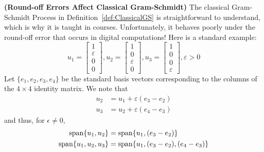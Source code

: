 \begin{rem}
\label{rem:ModifiedGramSchmidt} \textbf{(Round-off Errors Affect Classical Gram-Schmidt)}
The classical Gram-Schmidt Process in Definition~\ref{def:ClassicalGS} is straightforward to understand, which is why it is taught in courses. Unfortunately, it behaves poorly under the round-off error that occurs in digital computations! Here is a standard example:
    \begin{equation*}
        u_1=\left[\begin{matrix} 1 \\ \varepsilon \\ 0 \\ 0 \end{matrix}\right],
        u_2=\left[\begin{matrix} 1 \\ 0 \\ \varepsilon \\ 0 \end{matrix}\right],
        u_3=\left[\begin{matrix} 1 \\ 0 \\ 0 \\ \varepsilon \end{matrix}\right],
        \varepsilon>0
    \end{equation*}
Let $\{e_1,e_2,e_3,e_4\}$ be the standard basis vectors corresponding to the columns of the $4 \times 4$ identity matrix. We note that
    \begin{align*}
        u_2 &= u_1+\varepsilon(e_3-e_2)\\
        u_3 &= u_2+\varepsilon(e_4-e_3)
    \end{align*}
    and thus, for $\epsilon \neq 0,$
    \begin{align*}
        \mathrm{span} \{ u_1,u_2 \}&=\mathrm{span} \{ u_1,(e_3-e_2) \}\\
        \mathrm{span} \{ u_1,u_2,u_3 \}&=\mathrm{span} \{ u_1,(e_3-e_2),(e_4-e_3) \}
    \end{align*}
\end{rem}


